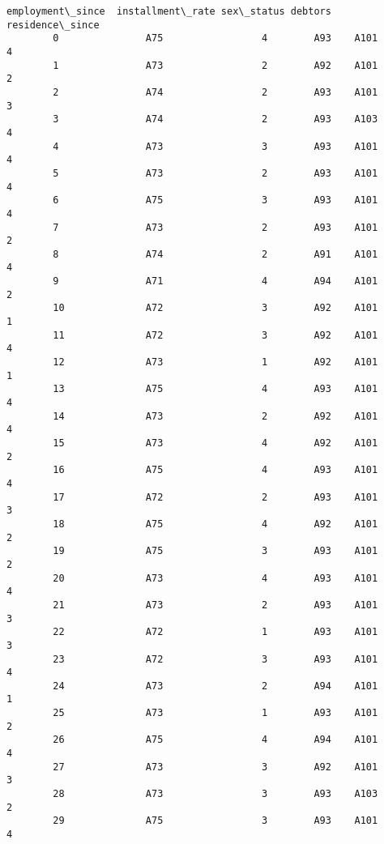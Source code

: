 \documentclass[11pt]{article}
\begin{document}
\begin{Verbatim}[commandchars=\\\{\}]
           employment\_since  installment\_rate sex\_status debtors  residence\_since  
        0               A75                 4        A93    A101                4  
        1               A73                 2        A92    A101                2  
        2               A74                 2        A93    A101                3  
        3               A74                 2        A93    A103                4  
        4               A73                 3        A93    A101                4  
        5               A73                 2        A93    A101                4  
        6               A75                 3        A93    A101                4  
        7               A73                 2        A93    A101                2  
        8               A74                 2        A91    A101                4  
        9               A71                 4        A94    A101                2  
        10              A72                 3        A92    A101                1  
        11              A72                 3        A92    A101                4  
        12              A73                 1        A92    A101                1  
        13              A75                 4        A93    A101                4  
        14              A73                 2        A92    A101                4  
        15              A73                 4        A92    A101                2  
        16              A75                 4        A93    A101                4  
        17              A72                 2        A93    A101                3  
        18              A75                 4        A92    A101                2  
        19              A75                 3        A93    A101                2  
        20              A73                 4        A93    A101                4  
        21              A73                 2        A93    A101                3  
        22              A72                 1        A93    A101                3  
        23              A72                 3        A93    A101                4  
        24              A73                 2        A94    A101                1  
        25              A73                 1        A93    A101                2  
        26              A75                 4        A94    A101                4  
        27              A73                 3        A92    A101                3  
        28              A73                 3        A93    A103                2  
        29              A75                 3        A93    A101                4  
\end{Verbatim}
            
\end{document}
